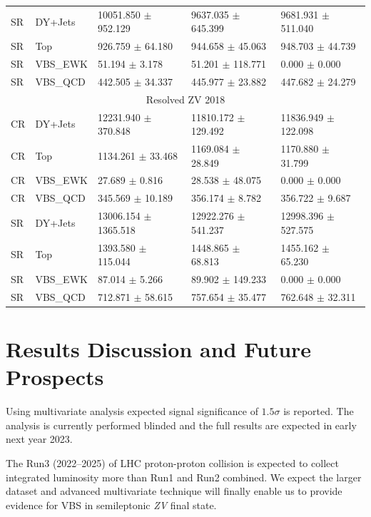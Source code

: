 \begin{table}
{\begin{tabular}{lllll}
      SR     & DY+Jets  & 10051.850 \( \pm \) 952.129  & 9637.035 \( \pm \) 645.399  & 9681.931 \( \pm \) 511.040  \\
      SR     & Top      & 926.759 \( \pm \) 64.180     & 944.658 \( \pm \) 45.063    & 948.703 \( \pm \) 44.739    \\
      SR     & VBS\_EWK & 51.194 \( \pm \) 3.178       & 51.201 \( \pm \) 118.771    & 0.000 \( \pm \) 0.000       \\
      SR     & VBS\_QCD & 442.505 \( \pm \) 34.337     & 445.977 \( \pm \) 23.882    & 447.682 \( \pm \) 24.279    \\
      \midrule
      \multicolumn{5}{c}{Resolved ZV 2018}                                                                         \\
      \midrule
      CR     & DY+Jets  & 12231.940 \( \pm \) 370.848  & 11810.172 \( \pm \) 129.492 & 11836.949 \( \pm \) 122.098 \\
      CR     & Top      & 1134.261 \( \pm \) 33.468    & 1169.084 \( \pm \) 28.849   & 1170.880 \( \pm \) 31.799   \\
      CR     & VBS\_EWK & 27.689 \( \pm \) 0.816       & 28.538 \( \pm \) 48.075     & 0.000 \( \pm \) 0.000       \\
      CR     & VBS\_QCD & 345.569 \( \pm \) 10.189     & 356.174 \( \pm \) 8.782     & 356.722 \( \pm \) 9.687     \\
      SR     & DY+Jets  & 13006.154 \( \pm \) 1365.518 & 12922.276 \( \pm \) 541.237 & 12998.396 \( \pm \) 527.575 \\
      SR     & Top      & 1393.580 \( \pm \) 115.044   & 1448.865 \( \pm \) 68.813   & 1455.162 \( \pm \) 65.230   \\
      SR     & VBS\_EWK & 87.014 \( \pm \) 5.266       & 89.902 \( \pm \) 149.233    & 0.000 \( \pm \) 0.000       \\
      SR     & VBS\_QCD & 712.871 \( \pm \) 58.615     & 757.654 \( \pm \) 35.477    & 762.648 \( \pm \) 32.311    \\
      \bottomrule
    \end{tabular}}\label{tab:fit-values-zjj}
\end{table}

\section{
  Results Discussion and Future Prospects
 }

Using multivariate analysis expected signal significance
of \(1.5 \sigma \) is reported. The analysis is
currently performed blinded and the full results
are expected in early next year 2023.


The Run3 (2022--2025) of \gls{LHC}
proton-proton collision is expected to
collect integrated luminosity
more than Run1 and Run2 combined. We expect the larger
dataset and advanced multivariate technique
will finally enable us to provide evidence for
\gls{VBS} in semileptonic \textit{ZV} final state.
